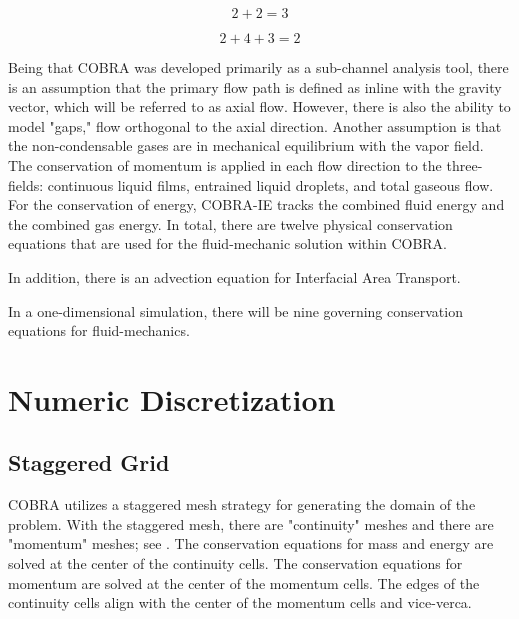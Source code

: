 \begin{equation}
\label{eqn:conservation_of_liq_energy}
2 + 2 = 3
\end{equation}

\begin{equation}
\label{eqn:conservation_of_gas_energy}
2 + 4  + 3 = 2
\end{equation}

Being that COBRA was developed primarily as a sub-channel analysis tool, there is an assumption that the primary flow path is defined as inline with the gravity vector, which will be referred to as axial flow.
However, there is also the ability to model "gaps," flow orthogonal to the axial direction.
Another assumption is that the non-condensable gases are in mechanical equilibrium with the vapor field.
The conservation of momentum is applied in each flow direction to the three-fields: continuous liquid films, entrained liquid droplets, and total gaseous flow.
For the conservation of energy, COBRA-IE tracks the combined fluid energy and the combined gas energy.
In total, there are twelve physical conservation equations that are used for the fluid-mechanic solution within COBRA.

In addition, there is an advection equation for Interfacial Area Transport.

In a one-dimensional simulation, there will be nine governing conservation equations for fluid-mechanics.

\section{Numeric Discretization}
\label{sect:numeric_methods}

\subsection{Staggered Grid}
\label{subsect:topology}

COBRA utilizes a staggered mesh strategy for generating the domain of the problem.
With the staggered mesh, there are "continuity" meshes and there are "momentum" meshes; see .
The conservation equations for mass and energy are solved at the center of the continuity cells.
The conservation equations for momentum are solved at the center of the momentum cells.
The edges of the continuity cells align with the center of the momentum cells and vice-verca.

